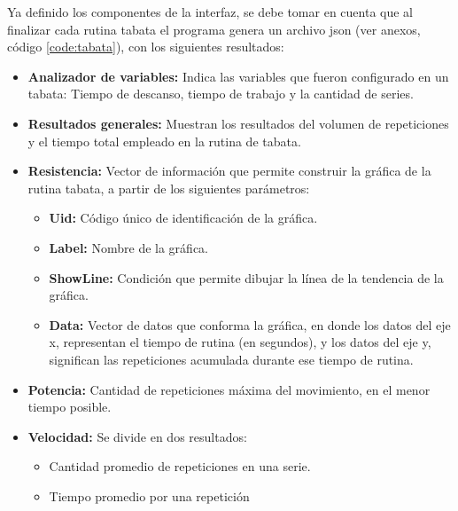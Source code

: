 Ya definido los componentes de la interfaz, se debe tomar en cuenta que al finalizar cada rutina tabata  el programa genera un archivo json (ver anexos, c\'odigo  \ref{code:tabata}), con los siguientes resultados:
\begin{itemize}
	\item \textbf{Analizador de variables:} Indica las variables que fueron configurado en un tabata: Tiempo de descanso, tiempo de trabajo y la cantidad de series.
	\item  \textbf{Resultados generales:} Muestran los resultados del volumen de repeticiones  y el tiempo total empleado en la rutina de tabata.
	\item  \textbf{Resistencia:} Vector de informaci\'on que permite construir la gr\'afica de la rutina tabata, a partir de los siguientes par\'ametros:
	   \begin{itemize}  
   	\item \textbf{Uid:} C\'odigo \'unico de identificaci\'on de la gr\'afica.
   	\item \textbf{Label:} Nombre de la gr\'afica.
   	\item \textbf{ShowLine:} Condici\'on que permite dibujar la l\'inea de la tendencia de la gr\'afica.
    \item \textbf{Data:} Vector de datos que conforma la gr\'afica, en donde los datos del eje x, representan el tiempo de rutina (en segundos), y los datos del eje y, significan las repeticiones acumulada durante ese tiempo de rutina.
   \end{itemize}     
    \item \textbf{Potencia:} Cantidad de repeticiones m\'axima del movimiento, en el menor tiempo posible.
    \item \textbf{Velocidad:} Se divide en dos resultados:
           \begin{itemize}
       \item Cantidad promedio de repeticiones en una serie.
       \item Tiempo promedio por una repetici\'on
       \end{itemize}
\end{itemize} 
